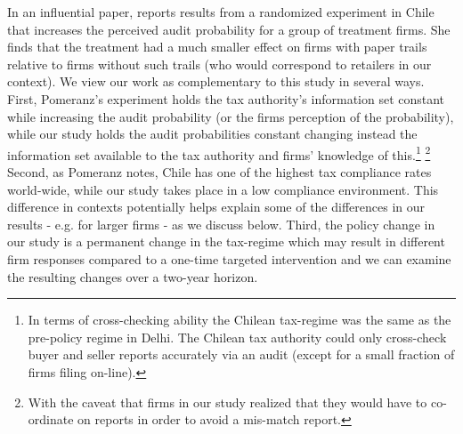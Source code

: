 In an influential paper, \cite{pomeranz2015no} reports results from a randomized experiment in Chile that increases the perceived audit probability for a group of treatment firms. She finds that the treatment had a much smaller effect on firms with paper trails relative to firms without such trails (who would correspond to retailers in our context). We view our work as complementary to this study in several ways. First, Pomeranz's experiment holds the tax authority's information set constant while increasing the audit probability (or the firms perception of the probability), while our study holds the audit probabilities constant changing instead the information set available to the tax authority and firms' knowledge of this.\footnote{In terms of cross-checking ability the Chilean tax-regime was the same as the pre-policy regime in Delhi. The Chilean tax authority could only cross-check buyer and seller reports accurately via an audit (except for a small fraction of firms filing on-line).} \footnote{With the caveat that firms in our study realized that they would have to co-ordinate on reports in order to avoid a mis-match report.}  Second, as Pomeranz notes, Chile has one of the highest tax compliance rates world-wide, while our study takes place in a low compliance environment. This difference in contexts potentially helps explain some of the differences in our results - e.g. for larger firms - as we discuss below. Third, the policy change in our study is a permanent change in the tax-regime which may result in different firm responses compared to a one-time targeted intervention and we can examine the resulting changes over a two-year horizon.

